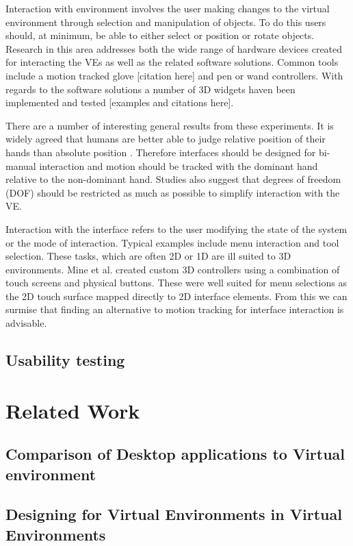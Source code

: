 \documentclass{sig-alternate-05-2015}
\begin{document}
 Interaction with environment involves the user making changes to the virtual environment through selection and manipulation of objects. To do this users should, at minimum, be able to either select or position or rotate objects\cite{Bowman2001}. Research in this area addresses both the wide range of hardware devices created for interacting the VEs as well as the related software solutions. Common tools include a motion tracked glove [citation here] and pen or wand controllers. With regards to the software solutions a number of 3D widgets haven been implemented and tested [examples and citations here].
 
 There are a number of interesting general results from these experiments. It is widely agreed that humans are better able to judge relative position of their hands than absolute position \cite{Bowman1998, Buxton1986}. Therefore interfaces should be designed for bi-manual interaction and motion should be tracked with the dominant hand relative to the non-dominant hand. Studies also suggest that degrees of freedom (DOF) should be restricted as much as possible to simplify interaction with the VE.
 
 Interaction with the interface refers to the user modifying the state of the system or the mode of interaction\cite{Bowman2001}. Typical examples include menu interaction and tool selection. These tasks, which are often 2D or 1D are ill suited to 3D environments\cite{Bowman2001}. Mine et al. created custom 3D controllers using a combination of touch screens and physical buttons. \cite{Mine2014} These were well suited for menu selections as the 2D touch surface mapped directly to 2D interface elements. From this we can surmise that finding an alternative to motion tracking for interface interaction is advisable.
\subsection{Usability testing}
\section{Related Work}
\subsection{Comparison of Desktop applications to Virtual environment}
\subsection{Designing for Virtual Environments in Virtual Environments}



\end{document}
